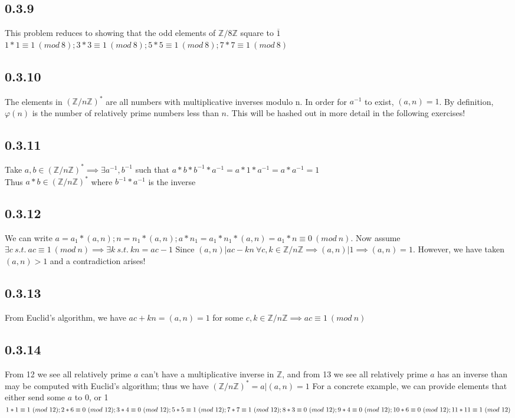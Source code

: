 \documentclass[11pt]{article}
\begin{document}
	\subsection*{0.3.9}
		This problem reduces to showing that the odd elements of $\mathbb{Z}/8\mathbb{Z}$ square to $\overline{1}$\\
		$1*1 \equiv 1\ (mod\ 8); 3*3 \equiv 1\ (mod\ 8); 5*5 \equiv 1\ (mod\ 8); 7*7 \equiv 1\ (mod\ 8)$ 
	\subsection*{0.3.10}
		The elements in $(\mathbb{Z}/n\mathbb{Z})^*$ are all numbers with multiplicative inverses modulo n.  In order for $a^{-1}$ to exist, $(a, n) = 1$. By definition, $\varphi(n)$ is the number of relatively prime numbers less than $n$.  This will be hashed out in more detail in the following exercises!
	\subsection*{0.3.11}
		Take $a, b \in (\mathbb{Z}/n\mathbb{Z})^* \implies \exists a^{-1}, b^{-1}$ such that $a*b*b^{-1}*a^{-1} = a*1*a^{-1} =  a*a^{-1} = 1$\\
		Thus $a*b \in (\mathbb{Z}/n\mathbb{Z})^*$ where $b^{-1}*a^{-1}$ is the inverse
	\subsection*{0.3.12}
		We can write $a = a_1*(a,n); n = n_1*(a, n); a*n_1 = a_1*n_1*(a, n) = a_1*n \equiv 0\ (mod\ n)$.  Now assume $\exists c\ s.t.\ ac \equiv 1\ (mod\ n) \implies \exists k\ s.t.\ kn = ac - 1$  Since $(a, n) | ac - kn\ \forall c, k \in \mathbb{Z}/n\mathbb{Z} \implies (a, n) | 1 \implies (a, n) = 1$.  However, we have taken $(a, n) > 1$ and a contradiction arises!
	\subsection*{0.3.13}
		From Euclid's algorithm, we have $ac + kn = (a, n) = 1$ for some $c, k \in \mathbb{Z}/n\mathbb{Z} \implies ac \equiv 1\ (mod\ n)$
	\subsection*{0.3.14}
		From 12 we see all relatively prime $a$ can't have a multiplicative inverse in $\mathbb{Z}$, and from 13 we see all relatively prime $a$ has an inverse than may be computed with Euclid's algorithm; thus we have $(\mathbb{Z}/n\mathbb{Z})^* = {a | (a, n) = 1}$  For a concrete example, we can provide elements that either send some $a$ to 0, or 1\\
	$1*1 \equiv 1\ (mod\ 12); 2*6 \equiv 0\ (mod\ 12); 3*4 \equiv 0\ (mod\ 12); 5*5 \equiv 1\ (mod\ 12);\\ 7*7 \equiv 1\ (mod\ 12); 8*3 \equiv 0\ (mod\ 12); 9*4 \equiv 0\ (mod\ 12); 10*6 \equiv 0\ (mod\ 12); 11*11 \equiv 1\ (mod\ 12)$
\end{document}
